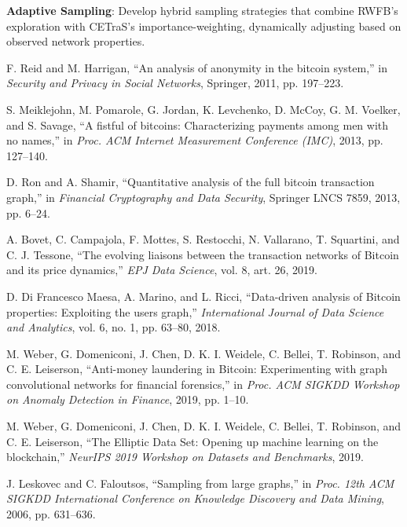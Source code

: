 \textbf{Adaptive Sampling}: Develop hybrid sampling strategies that combine RWFB's exploration with CETraS's importance-weighting, dynamically adjusting based on observed network properties.


\begin{thebibliography}{99}

F. Reid and M. Harrigan,
``An analysis of anonymity in the bitcoin system,''
in \textit{Security and Privacy in Social Networks}, Springer, 2011, pp. 197--223.

S. Meiklejohn, M. Pomarole, G. Jordan, K. Levchenko, D. McCoy, G. M. Voelker, and S. Savage,
``A fistful of bitcoins: Characterizing payments among men with no names,''
in \textit{Proc. ACM Internet Measurement Conference (IMC)}, 2013, pp. 127--140.

D. Ron and A. Shamir,
``Quantitative analysis of the full bitcoin transaction graph,''
in \textit{Financial Cryptography and Data Security}, Springer LNCS 7859, 2013, pp. 6--24.

A. Bovet, C. Campajola, F. Mottes, S. Restocchi, N. Vallarano, T. Squartini, and C. J. Tessone,
``The evolving liaisons between the transaction networks of Bitcoin and its price dynamics,''
\textit{EPJ Data Science}, vol. 8, art. 26, 2019.

D. Di Francesco Maesa, A. Marino, and L. Ricci,
``Data-driven analysis of Bitcoin properties: Exploiting the users graph,''
\textit{International Journal of Data Science and Analytics}, vol. 6, no. 1, pp. 63--80, 2018.

M. Weber, G. Domeniconi, J. Chen, D. K. I. Weidele, C. Bellei, T. Robinson, and C. E. Leiserson,
``Anti-money laundering in Bitcoin: Experimenting with graph convolutional networks for financial forensics,''
in \textit{Proc. ACM SIGKDD Workshop on Anomaly Detection in Finance}, 2019, pp. 1--10.

M. Weber, G. Domeniconi, J. Chen, D. K. I. Weidele, C. Bellei, T. Robinson, and C. E. Leiserson,
``The Elliptic Data Set: Opening up machine learning on the blockchain,''
\textit{NeurIPS 2019 Workshop on Datasets and Benchmarks}, 2019.

J. Leskovec and C. Faloutsos,
``Sampling from large graphs,''
in \textit{Proc. 12th ACM SIGKDD International Conference on Knowledge Discovery and Data Mining}, 2006, pp. 631--636.


\end{thebibliography}
